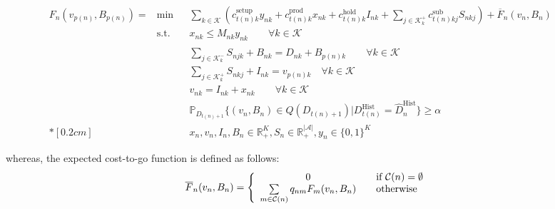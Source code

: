 \documentclass[10pt]{article}
\newcommand{\ti}{t} %
\newcommand{\ka}{k} %
\newcommand{\KA}{\mathcal{K}}
\newcommand{\Ka}{K}
\newcommand{\jey}{j} %
\newcommand{\Graf}{\mathcal{A}} %
\newcommand{\Bi}{B} %
\newcommand{\Vi}{v} %
\newcommand{\Es}{S} %
\newcommand{\x}{x} %
\newcommand{\y}{y} %
\newcommand{\cn}{\mathcal{C}(n) }
\newcommand{\Csub}{\mathcal{K}^+_k}
\newcommand{\Psub}{\mathcal{K}^-_k}
\begin{document}
\begin{subequations}
\label{DynamicProgrammingNoden}
\begin{flalign}
F_{n}(\Vi_{p(n)}, \Bi_{p(n)}) =&  \min && \sum_{\ka \in \KA} \left( c^{\text{setup}}_{\ti(n) \ka}\y_{n \ka} + c^{\text{prod}}_{\ti(n) \ka}\x_{n \ka} + c^{\text{hold}}_{\ti(n) \ka} {I}_{n \ka}+  \sum_{\jey \in \Csub}c^{\text{sub}}_{\ti(n) \ka \jey} \Es_{n  \ka \jey}\right) + \overline{F}_{n}(\Vi_{n}, \Bi_{n}) &&
\label{eq:Dyn_g2_Sub_ST_Production_Flow}& \\
&\text{s.t.} && \x_{n \ka} \leq M_{n \ka} \y_{n \ka} \quad\quad  \forall \ka  \in \KA & & \label{eq:Dyn_Sub_Setup}&\\
& && \sum_{\jey \in  \Psub} {S}_{n \jey \ka} + \Bi_{n  \ka}  = \hat{D}_{n \ka} + {\Bi}_{p(n) \ka} \quad\quad \forall \ka  \in \KA&& \label{eq:Bhat}& \\
& &&\sum_{\jey \in  \Csub} {S}_{n \ka \jey} + I_{n \ka} = {\Vi}_{p(n)\ka}  \quad \forall \ka  \in \KA& \label{eq:vhat}&\\
& &&\Vi_{n \ka} = I_{n  \ka} + \x_{n  \ka}  \quad\quad \forall \ka  \in \KA  &\label{eq:vdef}&
\\
& &&\mathbb{P}_{D_{\ti(n)+1}}\{ ({\Vi}_{n}, {\Bi}_{n} ) \in Q(D_{\ti(n)+1} )| D^\text{Hist}_{\ti(n)} = \hat{D}^\text{Hist}_{n} \} \geq \alpha &&\label{eq:SL}&
\\*[0.2cm]
& &&{x}_{ n },  {v}_{ n },  {I}_{ n } , {\Bi}_{ n } \in \mathbb{R}_{+}^{\Ka} , {S}_{n} \in \mathbb{R}_{+}^{|\Graf|} ,{y}_{ n } \in \{0,1\}^{\Ka}&& \label{eq:Dyn_F_Sub_ST_bound1}&
\end{flalign}
\end{subequations}



whereas, the expected cost-to-go function is defined as follows:
\begin{align}
&\overline{F}_{n}(\Vi_{n}, \Bi_{n}) =  \left\{ 
  \begin{array}{ c l }
    0 & \quad \textrm{if } \mathcal{C}(n) = \emptyset \\
    \sum\limits_{m \in \cn}  q_{nm}F_{m}(\Vi_{n}, {\Bi_{n}}  )                 & \quad \textrm{otherwise}
  \end{array}
\right.&  
\label{eq:cost-to-go-exp} 
\end{align}
\end{document}
